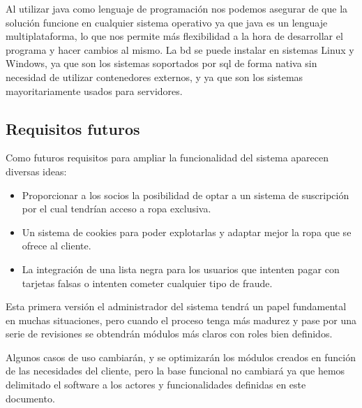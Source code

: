 Al utilizar java como lenguaje de programación nos podemos asegurar de que la solución funcione en cualquier sistema operativo ya que java es un lenguaje multiplataforma, lo que nos permite más flexibilidad a la hora de desarrollar el programa y hacer cambios al mismo. La \gls{bd} se puede instalar en sistemas Linux y Windows, ya que son los sistemas soportados por \gls{sql} de forma nativa sin necesidad de utilizar contenedores externos, y ya que son los sistemas mayoritariamente usados para servidores.

\subsection{Requisitos futuros}
Como futuros requisitos para ampliar la funcionalidad del sistema aparecen diversas ideas:
\begin{itemize}
    \item Proporcionar a los socios la posibilidad de optar a un sistema de suscripción por el cual tendrían acceso a ropa exclusiva.
    \item Un sistema de cookies para poder explotarlas y adaptar mejor la ropa que se ofrece al cliente.
    \item La integración de una lista negra para los usuarios que intenten pagar con tarjetas falsas o intenten cometer cualquier tipo de fraude.
\end{itemize}

Esta primera versión el administrador del sistema tendrá un papel fundamental en
muchas situaciones, pero cuando el proceso tenga más madurez y pase por una serie
de revisiones se obtendrán módulos más claros con roles bien definidos.

Algunos casos de uso cambiarán, y se optimizarán los módulos creados en función de
las necesidades del cliente, pero la base funcional no cambiará ya que hemos
delimitado el software a los actores y funcionalidades definidas en este documento.

